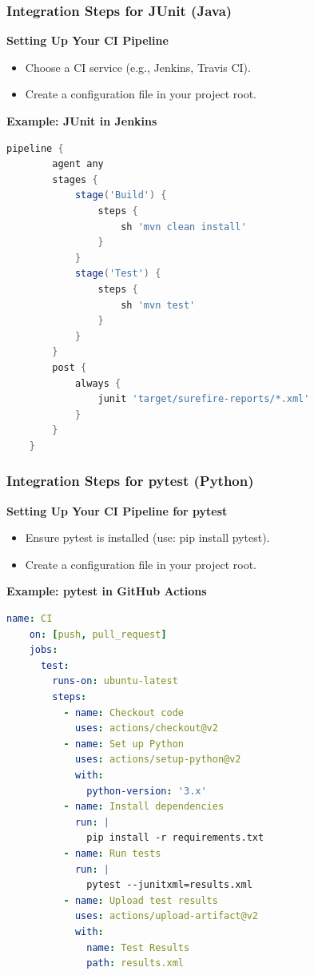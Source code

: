 \documentclass{beamer}
\begin{document}
\begin{frame}[fragile]
    \frametitle{Integration Steps for JUnit (Java)}
    \textbf{Setting Up Your CI Pipeline}
    \begin{itemize}
        \item Choose a CI service (e.g., Jenkins, Travis CI).
        \item Create a configuration file in your project root.
    \end{itemize}
    
    \textbf{Example: JUnit in Jenkins}
    \begin{lstlisting}[language=groovy]
    pipeline {
        agent any
        stages {
            stage('Build') {
                steps {
                    sh 'mvn clean install'
                }
            }
            stage('Test') {
                steps {
                    sh 'mvn test'
                }
            }
        }
        post {
            always {
                junit 'target/surefire-reports/*.xml'
            }
        }
    }
    \end{lstlisting}
\end{frame}

\begin{frame}[fragile]
    \frametitle{Integration Steps for pytest (Python)}
    \textbf{Setting Up Your CI Pipeline for pytest}
    \begin{itemize}
        \item Ensure pytest is installed (use: pip install pytest).
        \item Create a configuration file in your project root.
    \end{itemize}

    \textbf{Example: pytest in GitHub Actions}
    \begin{lstlisting}[language=yaml]
    name: CI
    on: [push, pull_request]
    jobs:
      test:
        runs-on: ubuntu-latest
        steps:
          - name: Checkout code
            uses: actions/checkout@v2
          - name: Set up Python
            uses: actions/setup-python@v2
            with:
              python-version: '3.x'
          - name: Install dependencies
            run: |
              pip install -r requirements.txt
          - name: Run tests
            run: |
              pytest --junitxml=results.xml
          - name: Upload test results
            uses: actions/upload-artifact@v2
            with:
              name: Test Results
              path: results.xml
    \end{lstlisting}
\end{frame}
\end{document}
